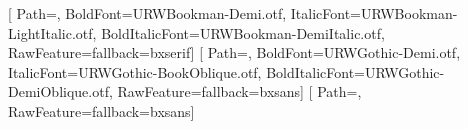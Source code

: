 \makeatletter

\usepackage[a5paper, inner=18mm, outer=15mm, top=19mm, bottom=20mm,
  headsep=6mm, footskip=10mm, headheight=12.5pt]{geometry}

\ifpolski
  \usepackage[english,polish]{babel}
\else
  \usepackage[polish,english]{babel}
\fi

\usepackage{fontspec}
  {\def\bx@fp{fonts/}}{\def\bx@fp{}}


\setmainfont{URWBookman-Light.otf}[
  Path=\bx@fp,
  BoldFont=URWBookman-Demi.otf,
  ItalicFont=URWBookman-LightItalic.otf,
  BoldItalicFont=URWBookman-DemiItalic.otf,
  RawFeature={fallback=bxserif}]
\setsansfont{URWGothic-Book.otf}[
  Path=\bx@fp,
  BoldFont=URWGothic-Demi.otf,
  ItalicFont=URWGothic-BookOblique.otf,
  BoldItalicFont=URWGothic-DemiOblique.otf,
  RawFeature={fallback=bxsans}]
\newfontfamily{}[
  Path=\bx@fp, RawFeature={fallback=bxsans}]

\usepackage{microtype}

\usepackage{xcolor}
\usepackage{graphicx}
\graphicspath{{img/}}
\usepackage{tikz}
\usepackage{needspace}
\usepackage{lettrine}
\usepackage{scrlayer-scrpage}
\usepackage{kantlipsum} %
\usepackage[hidelinks, pdfusetitle]{hyperref}

\makeatother
